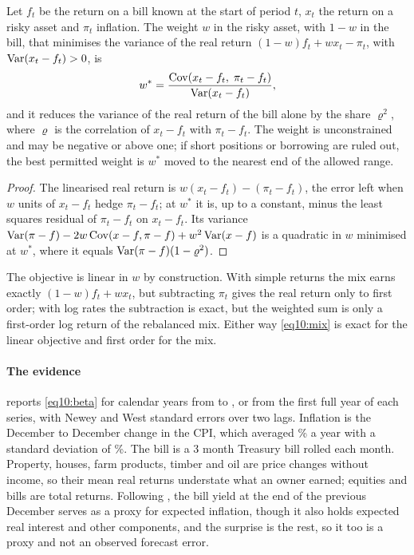 \begin{chapterrefs}
\begin{proposition}\label{prop10:mix}
Let $f_t$ be the return on a bill known at the start of period $t$, $x_t$ the return on a risky asset and
$\pi_t$ inflation. The weight $w$ in the risky asset, with $1-w$ in the bill, that minimises the variance of
the real return $(1-w)f_t+wx_t-\pi_t$, with $\operatorname{Var}(x_t-f_t)>0$, is
\begin{equation}\label{eq10:mix}
  w^*=\frac{\operatorname{Cov}(x_t-f_t,\;\pi_t-f_t)}{\operatorname{Var}(x_t-f_t)},
\end{equation}
and it reduces the variance of the real return of the bill alone by the share $\varrho^2$, where $\varrho$ is
the correlation of $x_t-f_t$ with $\pi_t-f_t$. The weight is unconstrained and may be negative or above
one; if short positions or borrowing are ruled out, the best permitted weight is $w^*$ moved to the
nearest end of the allowed range.
\end{proposition}

\begin{proof}
The linearised real return is $w(x_t-f_t)-(\pi_t-f_t)$, the error left when $w$ units of $x_t-f_t$
hedge $\pi_t-f_t$; at $w^*$ it is, up to a constant, minus the least squares residual of $\pi_t-f_t$ on
$x_t-f_t$. Its variance $\operatorname{Var}(\pi-f)-2w\operatorname{Cov}(x-f,\pi-f)+w^2\operatorname{Var}(x-f)$ is a quadratic in $w$ minimised at $w^*$, where it
equals $\operatorname{Var}(\pi-f)(1-\varrho^2)$.
\end{proof}

The objective is linear in $w$ by construction. With simple returns the mix earns exactly
$(1-w)f_t+wx_t$, but subtracting $\pi_t$ gives the real return only to first order; with log rates the
subtraction is exact, but the weighted sum is only a first-order log return of the rebalanced mix.
Either way \cref{eq10:mix} is exact for the linear objective and first order for the mix.

\paragraph{The evidence}
 reports \cref{eq10:beta} for calendar years from \ihFirst{} to \ihLast, or from the
first full year of each series, with Newey and West standard errors over two lags. Inflation is the
December to December change in the CPI, which averaged \ihInflMean\% a year with a standard deviation of
\ihInflSd\%. The bill is a 3 month Treasury bill rolled each month. Property, houses, farm products,
timber and oil are price changes without income, so their mean real returns understate what an owner
earned; equities and bills are total returns. Following \textcite{fama1977}, the bill yield at the end of the previous December
serves as a proxy for expected inflation, though it also holds expected real interest and other
components, and the surprise is the rest, so it too is a proxy and not an observed forecast error.


\end{chapterrefs}
